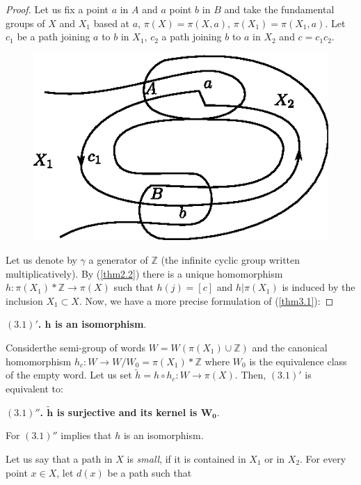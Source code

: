  \begin{proof}
Let us fix a point $a$ in $A$ and $a$ point $b$ in $B$ and take the
fundamental groups of $X$ and $X_1$ based at $a$, $\pi (X)= \pi
(X,a)$, $\pi (X_1) =  \pi (X_1, a)$. Let  $c_1$ be a path joining
$a$ to $b$ in $X_1$, $c_2$ a path joining $b$ to $a$ in $X_2$ and $c=
c_1 c_2$.
\begin{figure}[H]
\centering
\includegraphics{vol44-fig/fig44-2.eps}
\end{figure}
 
 Let us denote by $\gamma$ a generator of $\mathbb{Z}$ (the infinite
 cyclic group written multiplicatively). By (\ref{thm2.2}) there is a
 unique
 homomorphism $h : \pi (X_1) \ast \mathbb{Z} \to \pi (X)$ such that
 $h(j)= [c]$ and $h | \pi (X_1)$ is induced by the inclusion $X_1
 \subset X$. Now, we have a more precise formulation of (\ref{thm3.1}):  
 \end{proof}

 \medskip
 \noindent
 \textbf{$\boldsymbol{(3.1)'}$. $\boldsymbol{h}$ is an isomorphism}.
 
 Consider\pageoriginale the semi-group of words $W =W (\pi (X_1) \cup 
 \mathbb{Z})$ and the canonical homomorphism $h_c :W \to W /W_0  =
 \pi (X_1) \ast \mathbb{Z}$ where $W_0$ is the equivalence class of
 the empty word. Let us set $\tilde{h} = h\circ h_c : W \to \pi (X)$.  Then,
 $(3.1)'$ is equivalent to:   
 
 \medskip
 \noindent
 \textbf{$\boldsymbol{(3.1)''}$. $\boldsymbol{\tilde{h}}$ is surjective and
   its kernel is $\boldsymbol{W_0}$}. 
 
 For $(3.1)''$ implies that $h$ is an isomorphism. 
 
 Let us say that a path in $X$ is \textit{small}, if it is contained
 in $X_1$ or in $X_2$. For every  point $x \in X$, let $d(x)$ be a
 path such that 
 
